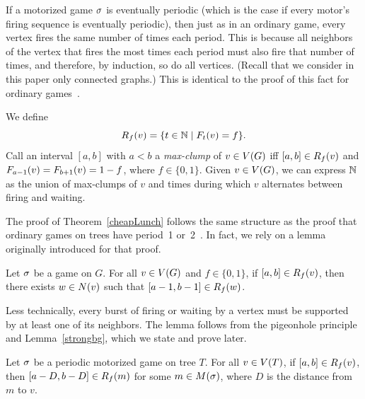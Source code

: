 If a motorized game $\s$ is eventually periodic (which is the case if every
motor's firing sequence is eventually periodic), then just as in an ordinary
game, every vertex fires the same number of times each period. This is because
all neighbors of the vertex that fires the most times each period must also
fire that number of times, and therefore, by induction, so do all
vertices. (Recall that we consider in this paper only connected graphs.) This
is identical to the proof of this fact for ordinary games~\cite{jiang}.

We define
\[
  \pat{v}{f} = \set{t \in \nats}{\firing{v}{t} = f}.
\]
Call an interval $[a, b]$ with $a < b$ a \emph{max-clump} of $v \in \V$ iff
$[a, b] \in \pat{v}{f}$ and $\firing{v}{a-1} = \firing{v}{b+1} = 1-f$, where $f
\in \{0,1\}$. Given $v \in \V$, we can express $\nats$ as the union of
max-clumps of $v$ and times during which $v$ alternates between firing and
waiting.

The proof of Theorem~\ref{cheapLunch} follows the same structure as the proof
that ordinary games on trees have period~1 or~2~\cite{bitarGoles}. In fact, we
rely on a lemma originally introduced for that proof.

\begin{lem} \label{bitarGoles}
Let $\s$ be a game on $G$. For all $v \in \V$ and $f \in \{0,1\}$, if $[a, b]
\in \pat{v}{f}$, then there exists $w \in \N{v}$ such that $[a-1, b-1] \in
\pat{w}{f}$.
\end{lem}

Less technically, every burst of firing or waiting by a vertex must be
supported by at least one of its neighbors. The lemma follows from the
pigeonhole principle and Lemma~\ref{strongbg}, which we state and prove later.

\begin{thm} \label{cheapLunch}
Let $\s$ be a periodic motorized game on tree $T$. For all $v \in \V[T]$, if
$[a, b] \in \pat{v}{f}$, then $[a-D, b-D] \in \pat{m}{f}$ for some $m \in
\mots$, where $D$ is the distance from $m$ to $v$.
\end{thm}

